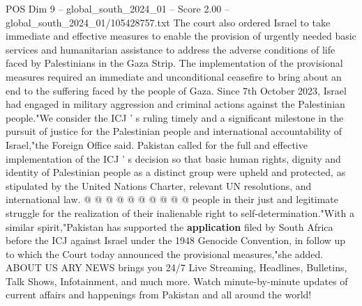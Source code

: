 \begin{textsample}{POS Dim 9 – global\_south\_2024\_01 – Score 2.00 – global\_south\_2024\_01/105428757.txt}
The court also ordered Israel to take immediate and effective measures to enable the provision of urgently needed basic services and humanitarian assistance to address the adverse conditions of life faced by Palestinians in the Gaza Strip.
The implementation of the provisional measures required an immediate and unconditional ceasefire to bring about an end to the suffering faced by the people of Gaza.
Since 7th October 2023, Israel had engaged in military aggression and criminal actions against the Palestinian people."We consider the ICJ ' s ruling timely and a significant milestone in the pursuit of justice for the Palestinian people and international accountability of Israel,"the Foreign Office said.
Pakistan called for the full and effective implementation of the ICJ ' s decision so that basic human rights, dignity and identity of Palestinian people as a distinct group were upheld and protected, as stipulated by the United Nations Charter, relevant UN resolutions, and international law. @ @ @ @ @ @ @ @ @ @ people in their just and legitimate struggle for the realization of their inalienable right to self-determination."With a similar spirit,"Pakistan has supported the \textbf{application} filed by South Africa before the ICJ against Israel under the 1948 Genocide Convention, in follow up to which the Court today announced the provisional measures,"she added.
ABOUT US ARY NEWS brings you 24/7 Live Streaming, Headlines, Bulletins, Talk Shows, Infotainment, and much more.
Watch minute-by-minute updates of current affairs and happenings from Pakistan and all around the world!

\end{textsample}
